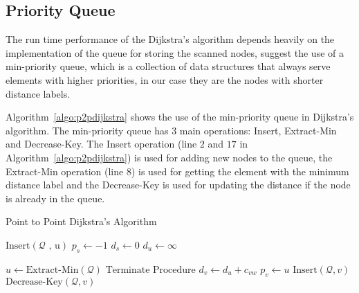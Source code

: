 \subsection{Priority Queue}
The run time performance of the Dijkstra's algorithm depends heavily on the implementation of the queue for storing the scanned nodes,
\citet{Cormen} suggest the use of a min-priority queue,
which is a collection of data structures that always serve elements with higher priorities, in our case they are the nodes with shorter distance labels.

Algorithm~\ref{algo:p2pdijkstra} shows the use of the min-priority queue in Dijkstra's algorithm.
The min-priority queue has 3 main operations: Insert, Extract-Min and Decrease-Key.
The Insert operation (line $2$ and $17$ in Algorithm~\ref{algo:p2pdijkstra}) is used for adding new nodes to the queue, the Extract-Min operation (line 8) is used for getting the element with the minimum distance label and the Decrease-Key is used for updating the distance if the node is already in the queue.

\begin{algorithm}[H]
    \caption{Point to Point Dijkstra's Algorithm}
    \label{algo:p2pdijkstra}
    \begin{algorithmic}[1]
        \State $\text{Insert}(\mathcal{Q}\text{ , u})$ 
        \State $p_s \gets -1$ 
        \State $d_s \gets 0$
         
        \State $d_u \gets \infty$
    \EndFor

    \State $ u \gets \text{Extract-Min}(\mathcal{Q}) $ 
    \State $\text{Terminate Procedure}$ 
\EndIf
{}
 
\State $d_v \gets d_u + c_{vw}$
\State $p_v \gets u$
\State $\text{Insert}(\mathcal{Q}, v)$ 
\Else
\State $\text{Decrease-Key}(\mathcal{Q}, v)$ 
    \EndIf
\EndIf
                \EndFor
            \EndIf
        \EndWhile
    \EndProcedure
\end{algorithmic}
\end{algorithm}


